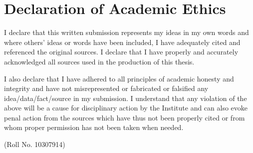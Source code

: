   \chapter*{Declaration of Academic Ethics}
  \thispagestyle{empty}
  \doublespace
     I declare that this written submission represents my ideas in my own words and where others' ideas or words  have been included, I have adequately cited and referenced the original sources. I declare that I have properly and accurately acknowledged all sources used in the production of this thesis.
     
I also declare that I have adhered to all principles of academic honesty and integrity and have not misrepresented or fabricated or falsified any idea/data/fact/source in my submission.
  I understand that any violation of the above will be a cause for disciplinary action by the Institute and can also evoke penal action from the sources which have thus not been properly cited or from whom proper permission has not been taken when needed.
  
%
  \vskip 5cm
 
  \par
  \hspace{4in} {\large (Roll No. 10307914)}
  \par\newpage




